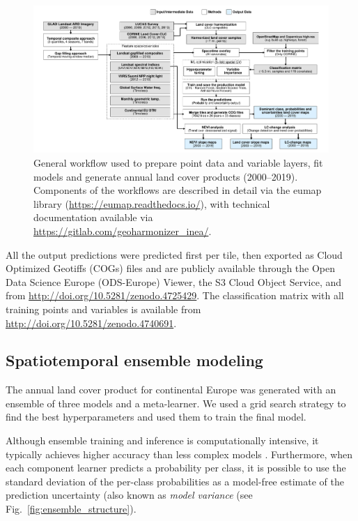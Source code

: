     \begin{figure}
    \centering
    \includegraphics[width=.95\textwidth]{figs_03/methods_general_workflow.pdf}
    \caption{General workflow used to prepare point data and variable layers, fit models and generate annual land cover products (2000--2019). Components of the workflows are described in detail via the \textsf{eumap} library (\url{https://eumap.readthedocs.io/}), with technical documentation available via \url{https://gitlab.com/geoharmonizer_inea/}.} \label{fig:scheme}
    \end{figure}
    
    All the output predictions were predicted first per tile, then exported as Cloud Optimized Geotiffs (COGs) files and are publicly available through the Open Data Science Europe (ODS-Europe) Viewer, the S3 Cloud Object Service, and from \url{http://doi.org/10.5281/zenodo.4725429}. The classification matrix with all training points and variables is available from \url{http://doi.org/10.5281/zenodo.4740691}.
    
\subsection*{Spatiotemporal ensemble modeling}
    
    The annual land cover product for continental Europe was generated with an ensemble of three models and a meta-learner. We used a grid search strategy to find the best hyperparameters and used them to train the final model.
    
        
    Although ensemble training and inference is computationally intensive, it typically achieves higher accuracy than less complex models \citep{seni2010ensemble,zhang2012ensemble}. Furthermore, when each component learner predicts a probability per class, it is possible to use the standard deviation of the per-class probabilities as a model-free estimate of the prediction uncertainty (also known as \emph{model variance} (see Fig.\@~\ref{fig:ensemble_structure}).

